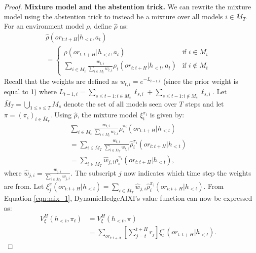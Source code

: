 \begin{proof}
    
    \textbf{Mixture model and the abstention trick.}  
    We can rewrite the mixture model using the abstention trick to instead be a mixture over all models $i \in \bar{M}_T$. %
    For an environment model $\rho$, define $\hat{\rho}$ as:
    \begin{multline*}
        \hat{\rho}(or_{t:t+H} | h_{<t}, a_t) \\
        = 
            \begin{cases}
                \rho(or_{t:t+H} | h_{<t}, a_t) &\text{if $i \in M_t$}\\
                \sum_{i \in M_t} \frac{w_{t, i}}{\sum_{i \in M_t} w_{t, i}} \rho_i(or_{t:t+H} | h_{<t}, a_t) &\text{if $i \notin M_t$}
            \end{cases}
    \end{multline*}
    Recall that the weights are defined as $w_{t, i} = e^{-L_{t-1, i}}$ (since the prior weight is equal to 1) where $L_{t-1, i} = \sum_{s \leq t-1: i \in M_s} \ell_{s, i} + \sum_{s \leq t-1: i \notin M_s} \ell_{s, i}$. 
    Let $\bar{M}_T = \bigcup_{1 \leq s \leq T} M_{s}$ denote the set of all models seen over $T$ steps and let $\pi = (\pi_i)_{i \in \bar{M}_T}$.
    Using $\hat{\rho}$, the mixture model $\xi^{\pi_t}_t$ is given by:
    \begin{multline}
        \sum_{i \in M_t} \frac{w_{t, i}}{\sum_{i \in M_t} w_{t, i}} \rho_i^{\pi_i}(or_{t:t+H} | h_{<t}) \\
        = \sum_{i \in \bar{M}_T} \frac{w_{t, i}}{\sum_{i \in \bar{M}_T} w_{t, i}} \hat{\rho}_{i}^{\pi_i}(or_{t:t+H} | h_{<t}) \\
        = \sum_{i \in \bar{M}_T} \hat{w}_{j, i} \hat{\rho}_i^{\pi_i}(or_{t:t+H} | h_{<t}), \label{eqn:mix_1}
    \end{multline}
    where $\hat{w}_{j, i} = \frac{w_{j, i}}{\sum_{i \in \bar{M}_T} w_{j, i}}$. The subscript $j$ now indicates which time step the weights are from. 
    Let $\xi_j^{\pi}(or_{t:t+H} | h_{<t}) = \sum_{i \in \bar{M}_T} \hat{w}_{j, i} \hat{\rho}_i^{\pi_i}(or_{t:t+H} | h_{<t})$. 
    From Equation \ref{eqn:mix_1}, DynamicHedgeAIXI's value function can now be expressed as:
    \begin{align*}
        V_{\xi}^{H}(h_{<t}, \pi_t) &= V_{\xi}^{H}(h_{<t}, \pi)\\
        &= \sum_{or_{t:t+H}} \left[ \sum_{j=t}^{t+H} r_j \right] \xi^{\pi}_t(or_{t:t+H} | h_{<t}).
    \end{align*}


\end{proof}
